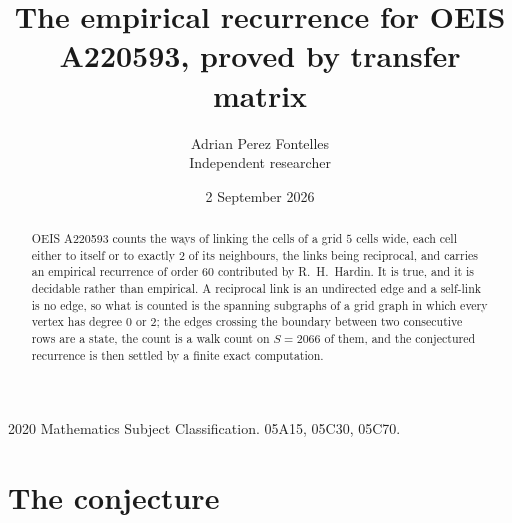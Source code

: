 \documentclass[11pt,a4paper]{article}
\title{The empirical recurrence for OEIS A220593, proved by transfer matrix}
\author{Adrian Perez Fontelles\\ \small Independent researcher}
\date{2 September 2026}
\theoremstyle{plain}
\theoremstyle{definition}
\begin{document}
\maketitle

\begin{abstract}
OEIS A220593 counts the ways of linking the cells of a grid $5$ cells wide, each cell either to
itself or to exactly $2$ of its neighbours, the links being reciprocal, and carries an
empirical recurrence of order $60$ contributed by R.~H.~Hardin. It is true, and it is
decidable rather than empirical. A reciprocal link is an undirected edge and a self-link is
no edge, so what is counted is the spanning subgraphs of a grid graph in which every vertex
has degree $0$ or $2$; the edges crossing the boundary between two consecutive rows are a
state, the count is a walk count on $S=2066$ of them, and the conjectured recurrence is then
settled by a finite exact computation.
\end{abstract}

\noindent\small 2020 Mathematics Subject Classification. 05A15, 05C30, 05C70.\normalsize

\section{The conjecture}
\end{document}
